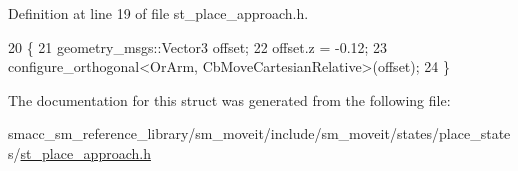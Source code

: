 Definition at line 19 of file st\+\_\+place\+\_\+approach.\+h.


\begin{DoxyCode}
20     \{
21         geometry\_msgs::Vector3 offset;
22         offset.z = -0.12;
23         configure\_orthogonal<OrArm, CbMoveCartesianRelative>(offset);
24     \}
\end{DoxyCode}


The documentation for this struct was generated from the following file\+:\begin{DoxyCompactItemize}
\item 
smacc\+\_\+sm\+\_\+reference\+\_\+library/sm\+\_\+moveit/include/sm\+\_\+moveit/states/place\+\_\+states/\hyperlink{st__place__approach_8h}{st\+\_\+place\+\_\+approach.\+h}\end{DoxyCompactItemize}
